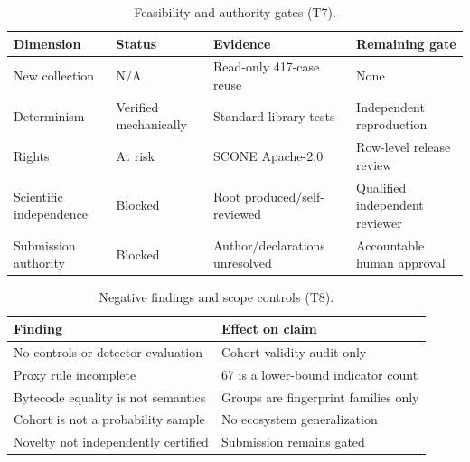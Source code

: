 \documentclass[10pt]{article}
\begin{document}
\begin{table}[h]
\centering\small
\caption{Feasibility and authority gates (T7).}
\begin{tabularx}{\linewidth}{l l X X}
\toprule Dimension & Status & Evidence & Remaining gate \\
\midrule
New collection & N/A & Read-only 417-case reuse & None \\
Determinism & Verified mechanically & Standard-library tests & Independent reproduction \\
Rights & At risk & SCONE Apache-2.0 & Row-level release review \\
Scientific independence & Blocked & Root produced/self-reviewed & Qualified independent reviewer \\
Submission authority & Blocked & Author/declarations unresolved & Accountable human approval \\
\bottomrule
\end{tabularx}
\end{table}

\begin{table}[h]
\centering\small
\caption{Negative findings and scope controls (T8).}
\begin{tabularx}{\linewidth}{X X}
\toprule Finding & Effect on claim \\
\midrule
No controls or detector evaluation & Cohort-validity audit only \\
Proxy rule incomplete & 67 is a lower-bound indicator count \\
Bytecode equality is not semantics & Groups are fingerprint families only \\
Cohort is not a probability sample & No ecosystem generalization \\
Novelty not independently certified & Submission remains gated \\
\bottomrule
\end{tabularx}
\end{table}
\end{document}
